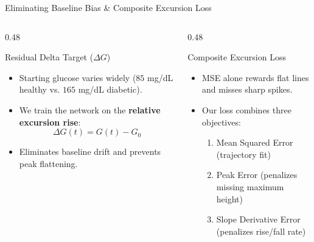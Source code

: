 \documentclass[aspectratio=169, 10pt]{beamer}
\begin{document}
\begin{frame}{Eliminating Baseline Bias \& Composite Excursion Loss}
  \begin{columns}[c]
    \begin{column}{0.48\textwidth}
      \begin{block}{Residual Delta Target ($\Delta G$)}
        \begin{itemize}\setlength{\itemsep}{0.4em}
          \item Starting glucose varies widely ($85$ mg/dL healthy vs. $165$ mg/dL diabetic).
          \item We train the network on the \textbf{relative excursion rise}:
          $$\Delta G(t) = G(t) - G_0$$
          \item Eliminates baseline drift and prevents peak flattening.
        \end{itemize}
      \end{block}
    \end{column}
    
    \begin{column}{0.48\textwidth}
      \begin{block}{Composite Excursion Loss}
        \begin{itemize}\setlength{\itemsep}{0.4em}
          \item MSE alone rewards flat lines and misses sharp spikes.
          \item Our loss combines three objectives:
          \begin{enumerate}\setlength{\itemsep}{0.2em}
            \item Mean Squared Error (trajectory fit)
            \item Peak Error (penalizes missing maximum height)
            \item Slope Derivative Error (penalizes rise/fall rate)
          \end{enumerate}
        \end{itemize}
      \end{block}
    \end{column}
  \end{columns}
\end{frame}
\end{document}
